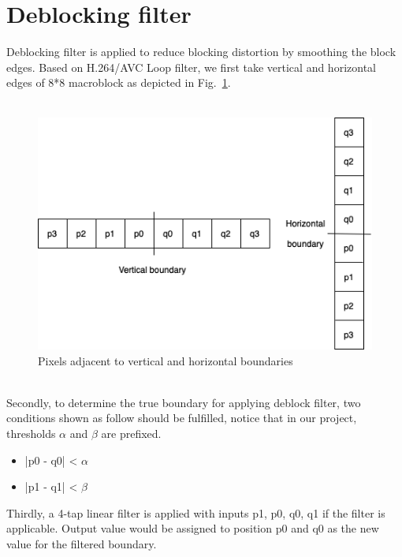 \documentclass[twocolumn]{article}  %
\begin{document}
\section{Deblocking filter}
Deblocking filter is applied to reduce blocking distortion by smoothing the block edges. Based on H.264/AVC Loop filter\cite{deblock}, we first take vertical and horizontal edges of 8*8 macroblock as depicted in Fig.~\ref{fig:0}. \\
\\
\begin{figure}[h]
\centering
\includegraphics[scale=0.45]{boundary.png}
\caption{Pixels adjacent to vertical and horizontal boundaries}
\label{fig:0}
\end{figure}\\
Secondly, to determine the true boundary for applying deblock filter, two conditions shown as follow should be fulfilled, notice that in our project, thresholds $\alpha$ and $\beta$ are prefixed.
\begin{itemize}
\item |p0 - q0| < $\alpha$
\item |p1 - q1| < $\beta$
\end{itemize}
Thirdly, a 4-tap linear filter is applied with inputs p1, p0, q0, q1 if the filter is applicable. Output value would be assigned to position p0 and q0 as the new value for the filtered boundary. 

\end{document}

